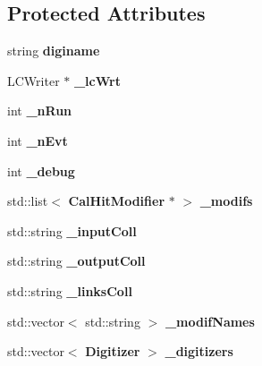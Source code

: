 \subsection*{Protected Attributes}
\begin{DoxyCompactItemize}
\item 
string {\bfseries diginame}\label{classdigisim_1_1DigiSimProcessor_a1f36e9a8e9f51d4138b194ae39e90344}

\item 
L\-C\-Writer $\ast$ {\bfseries \-\_\-lc\-Wrt}\label{classdigisim_1_1DigiSimProcessor_a775602d175432ad858eb44d3d2bfa8e9}

\item 
int {\bfseries \-\_\-n\-Run}\label{classdigisim_1_1DigiSimProcessor_ad02d718ca23c6918b78d56bc73170303}

\item 
int {\bfseries \-\_\-n\-Evt}\label{classdigisim_1_1DigiSimProcessor_a91a6f63de7603ee1d9fc13c95439cf4e}

\item 
int {\bfseries \-\_\-debug}\label{classdigisim_1_1DigiSimProcessor_af12d11d34e1b73e055a6f65fce61efd3}

\item 
std\-::list$<$ {\bf Cal\-Hit\-Modifier} $\ast$ $>$ {\bfseries \-\_\-modifs}\label{classdigisim_1_1DigiSimProcessor_a75b1fc16f09f7c3018a62a744f786663}

\item 
std\-::string {\bfseries \-\_\-input\-Coll}\label{classdigisim_1_1DigiSimProcessor_a4d79d468a8eaa78ee05c68df7c6b24d2}

\item 
std\-::string {\bfseries \-\_\-output\-Coll}\label{classdigisim_1_1DigiSimProcessor_a5b55fe6a6503cf31a89a066e96875057}

\item 
std\-::string {\bfseries \-\_\-links\-Coll}\label{classdigisim_1_1DigiSimProcessor_a99b2a5a5c2666d367b59eda5b1157a67}

\item 
std\-::vector$<$ std\-::string $>$ {\bfseries \-\_\-modif\-Names}\label{classdigisim_1_1DigiSimProcessor_ad1b9e146bff72901ef2f7714ff337185}

\item 
std\-::vector$<$ {\bf Digitizer} $>$ {\bfseries \-\_\-digitizers}\label{classdigisim_1_1DigiSimProcessor_a092b7a7d3a2311925a1ff343305f77ed}

\end{DoxyCompactItemize}


